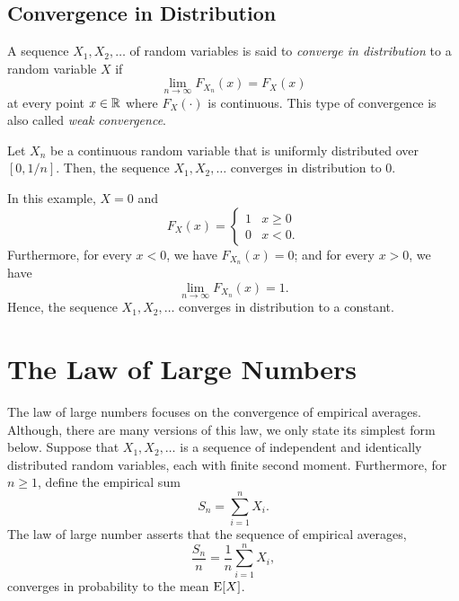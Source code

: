 \subsection{Convergence in Distribution}

A sequence $X_1, X_2, \ldots$ of random variables is said to \emph{converge in distribution} to a random variable $X$ if 
\begin{equation*}
\lim_{n \rightarrow \infty} F_{X_n} (x) = F_X (x)
\end{equation*}
at every point $x \in \mathbb{R}$ where $F_X (\cdot)$ is continuous.
This type of convergence is also called \emph{weak convergence}.  

\begin{example}
Let $X_n$ be a continuous random variable that is uniformly distributed over $[0, 1/n]$.
Then, the sequence $X_1, X_2, \ldots$ converges in distribution to $0$.

In this example, $X = 0$ and
\begin{equation*}
F_X (x) = \begin{cases} 1 & x \geq 0 \\
0 & x < 0. \end{cases}
\end{equation*}
Furthermore, for every $x < 0$, we have $F_{X_n} (x) = 0$; and for every $x > 0$, we have
\begin{equation*}
\lim_{n \rightarrow \infty} F_{X_n} (x) = 1.
\end{equation*}
Hence, the sequence $X_1, X_2, \ldots$ converges in distribution to a constant.
\end{example}


\section{The Law of Large Numbers}

The law of large numbers focuses on the convergence of empirical averages.
Although, there are many versions of this law, we only state its simplest form below.
Suppose that $X_1, X_2, \ldots$ is a sequence of independent and identically distributed random variables, each with finite second moment.
Furthermore, for $n \geq 1$, define the empirical sum
\begin{equation*}
S_n = \sum_{i=1}^n X_i .
\end{equation*}
The law of large number asserts that the sequence of empirical averages,
\begin{equation*}
\frac{S_n}{n} = \frac{1}{n} \sum_{i=1}^n X_i ,
\end{equation*}
converges in probability to the mean $\mathrm{E} [X]$.

